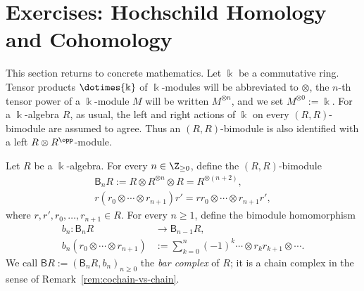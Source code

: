 
\section{Exercises: Hochschild Homology and Cohomology}\label{sec:HH}
\hypertarget{o014.aljabr2.chapter3.exercises-hochschild-homology-and-cohomology}{ }

This section returns to concrete mathematics. Let $\Bbbk$ be a commutative
ring. Tensor products $\dotimes{\Bbbk}$ of $\Bbbk$-modules will be abbreviated
to $\otimes$, the $n$-th tensor power of a $\Bbbk$-module $M$ will be written
$M^{\otimes n}$, and we set $M^{\otimes 0}:=\Bbbk$. For a $\Bbbk$-algebra
$R$, as usual, the left and right actions of $\Bbbk$ on every $(R,R)$-bimodule
are assumed to agree. Thus an $(R,R)$-bimodule is also identified with a left
$R\otimes R^{\opp}$-module.

\begin{definition}\label{def:bar-Hochschild}
	Let $R$ be a $\Bbbk$-algebra. For every $n\in\Z_{\geq 0}$, define the
	$(R,R)$-bimodule
	\begin{gather*}
		\mathsf{B}_n R := R \otimes R^{\otimes n} \otimes R = R^{\otimes (n+2)}, \\
		r(r_0 \otimes \cdots \otimes r_{n+1})r'
		= rr_0 \otimes \cdots \otimes r_{n+1} r',
	\end{gather*}
	where $r,r',r_0,\ldots,r_{n+1}\in R$. For every $n\geq1$, define the
	bimodule homomorphism
	\begin{equation*}\begin{split}
		b_n: \mathsf{B}_n R & \to \mathsf{B}_{n-1} R, \\
		b_n \left( r_0 \otimes \cdots \otimes r_{n+1} \right)
		& := \sum_{k=0}^n (-1)^k
		\cdots \otimes r_k r_{k+1} \otimes \cdots .
	\end{split}\end{equation*}
	We call $\mathsf{B}R:=\left(\mathsf{B}_nR,b_n\right)_{n\geq0}$ the
	\emph{bar complex} of $R$; it is a chain complex in the sense of
	Remark~\ref{rem:cochain-vs-chain}.
\end{definition}

